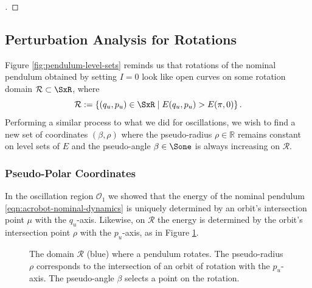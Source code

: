 \begin{proof}[\unskip\nopunct]
\end{proof}

\subsection{Perturbation Analysis for Rotations}
Figure \ref{fig:pendulum-level-sets} reminds us that rotations of the 
nominal pendulum obtained by setting \(I = 0\) look like open curves on some
rotation domain \(\mathcal{R} \subset \SxR\), where
\[
    \mathcal{R} := \left\{ (q_u,p_u) \in \SxR \mid E(q_u,p_u) > E(\pi,0)\right\}
    .
\]
Performing a similar process to what we did for oscillations,
we wish to find a new set of coordinates \((\beta,\rho)\)
where the pseudo-radius \(\rho \in \mathbb{R}\) remains constant on level sets
of \(E\) and the pseudo-angle \(\beta \in \Sone\) is always increasing on
\(\mathcal{R}\).

\subsubsection*{Pseudo-Polar Coordinates}

In the oscillation region \(\mathcal{O}_1\) we showed that the energy of the
nominal pendulum \eqref{eqn:acrobot-nominal-dynamics} is uniquely determined by
an orbit's intersection point \(\mu\) with the \(q_u\)-axis.
Likewise, on \(\mathcal{R}\) the energy is determined by the orbit's intersection
point \(\rho\) with the \(p_u\)-axis, as in Figure \ref{fig:rho-intersection}.

\begin{figure}
    \centering
    
    \caption{The domain \(\mathcal{R}\) (blue) where a pendulum rotates. The
        pseudo-radius \(\rho\) corresponds to the intersection of an orbit of
        rotation with the \(p_u\)-axis. The pseudo-angle \(\beta\) selects a
        point on the rotation.}
    \label{fig:rho-intersection}
\end{figure}

